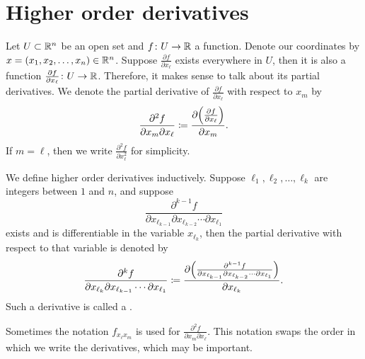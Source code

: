 
\sectionnewpage
\section{Higher order derivatives}
\label{sec:mvhighordders}


Let $U \subset {\mathbb{R}}^n$ be an open set and $f \colon U \to {\mathbb{R}}$ a function.
Denote our coordinates by $x = (x_1,x_2,\ldots,x_n) \in {\mathbb{R}}^n$.
Suppose $\frac{\partial f}{\partial x_{\ell}}$ exists everywhere in $U$,
then it is also a function $\frac{\partial f}{\partial x_{\ell}}
\colon U \to {\mathbb{R}}$.  Therefore, it makes sense to talk about its partial
derivatives.  We denote 
the partial derivative of $\frac{\partial f}{\partial x_{\ell}}$ with respect to
$x_m$ by
\begin{equation*}
\frac{\partial^2 f}{\partial x_m \partial x_{\ell}}
\coloneqq
\frac{\partial \Bigl( \frac{\partial f}{\partial x_{\ell}} \Bigr)}{\partial x_m} .
\end{equation*}
If $m={\ell}$, then we write 
$\frac{\partial^2 f}{\partial x_{\ell}^2}$ for simplicity.

We define higher order derivatives inductively.
Suppose ${\ell}_1,{\ell}_2,\ldots,{\ell}_k$ are integers between $1$ and $n$, and
suppose 
\begin{equation*}
\frac{\partial^{k-1} f}{\partial x_{{\ell}_{k-1}} \partial x_{{\ell}_{k-2}}
\cdots \partial x_{{\ell}_1}}
\end{equation*}
exists and is differentiable in the variable $x_{{\ell}_{k}}$, then the
partial derivative with respect to that variable is denoted by
\begin{equation*}
\frac{\partial^{k} f}{\partial x_{{\ell}_{k}} \partial x_{{\ell}_{k-1}}
\cdots \partial x_{{\ell}_1}}
\coloneqq 
\frac{\partial \Bigl( \frac{\partial^{k-1} f}{\partial x_{{\ell}_{k-1}} \partial
x_{{\ell}_{k-2}} \cdots \partial x_{{\ell}_1}} \Bigr)}{\partial x_{{\ell}_{k}}} .
\end{equation*}
Such a derivative is called a
\emph{}.

Sometimes the notation $f_{x_{\ell} x_m}$ is used for
$\frac{\partial^2 f}{\partial x_m \partial x_{\ell}}$.  This notation
swaps the order in which we write the derivatives, which may be important.

